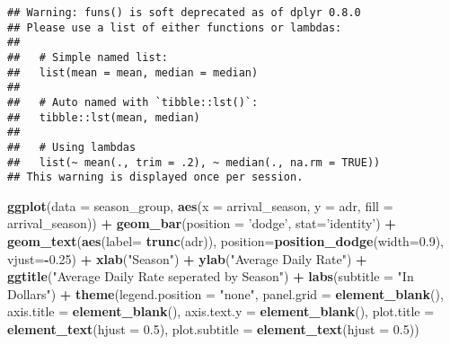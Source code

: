 \documentclass[]{article}
\newenvironment{Shaded}{\begin{snugshade}}{\end{snugshade}}
\newcommand{\DataTypeTok}[1]{\textcolor[rgb]{0.13,0.29,0.53}{#1}}
\newcommand{\FloatTok}[1]{\textcolor[rgb]{0.00,0.00,0.81}{#1}}
\newcommand{\KeywordTok}[1]{\textcolor[rgb]{0.13,0.29,0.53}{\textbf{#1}}}
\newcommand{\NormalTok}[1]{#1}
\newcommand{\OperatorTok}[1]{\textcolor[rgb]{0.81,0.36,0.00}{\textbf{#1}}}
\newcommand{\StringTok}[1]{\textcolor[rgb]{0.31,0.60,0.02}{#1}}
\begin{document}
\begin{verbatim}
## Warning: funs() is soft deprecated as of dplyr 0.8.0
## Please use a list of either functions or lambdas: 
## 
##   # Simple named list: 
##   list(mean = mean, median = median)
## 
##   # Auto named with `tibble::lst()`: 
##   tibble::lst(mean, median)
## 
##   # Using lambdas
##   list(~ mean(., trim = .2), ~ median(., na.rm = TRUE))
## This warning is displayed once per session.
\end{verbatim}

\begin{Shaded}
\begin{Highlighting}[]
\KeywordTok{ggplot}\NormalTok{(}\DataTypeTok{data =}\NormalTok{ season_group, }\KeywordTok{aes}\NormalTok{(}\DataTypeTok{x =}\NormalTok{ arrival_season, }\DataTypeTok{y =}\NormalTok{ adr, }\DataTypeTok{fill =}\NormalTok{ arrival_season)) }\OperatorTok{+}
\StringTok{  }\KeywordTok{geom_bar}\NormalTok{(}\DataTypeTok{position =} \StringTok{'dodge'}\NormalTok{, }\DataTypeTok{stat=}\StringTok{'identity'}\NormalTok{) }\OperatorTok{+}
\StringTok{  }\KeywordTok{geom_text}\NormalTok{(}\KeywordTok{aes}\NormalTok{(}\DataTypeTok{label=} \KeywordTok{trunc}\NormalTok{(adr)), }\DataTypeTok{position=}\KeywordTok{position_dodge}\NormalTok{(}\DataTypeTok{width=}\FloatTok{0.9}\NormalTok{), }\DataTypeTok{vjust=}\OperatorTok{-}\FloatTok{0.25}\NormalTok{) }\OperatorTok{+}
\StringTok{  }\KeywordTok{xlab}\NormalTok{(}\StringTok{"Season"}\NormalTok{) }\OperatorTok{+}\StringTok{ }\KeywordTok{ylab}\NormalTok{(}\StringTok{"Average Daily Rate"}\NormalTok{) }\OperatorTok{+}\StringTok{ }\KeywordTok{ggtitle}\NormalTok{(}\StringTok{"Average Daily Rate seperated by Season"}\NormalTok{) }\OperatorTok{+}\StringTok{ }\KeywordTok{labs}\NormalTok{(}\DataTypeTok{subtitle =} \StringTok{"In Dollars"}\NormalTok{) }\OperatorTok{+}\StringTok{ }
\StringTok{  }\KeywordTok{theme}\NormalTok{(}\DataTypeTok{legend.position =} \StringTok{"none"}\NormalTok{, }\DataTypeTok{panel.grid =} \KeywordTok{element_blank}\NormalTok{(),}
        \DataTypeTok{axis.title =} \KeywordTok{element_blank}\NormalTok{(),}
        \DataTypeTok{axis.text.y =} \KeywordTok{element_blank}\NormalTok{(),}
        \DataTypeTok{plot.title =} \KeywordTok{element_text}\NormalTok{(}\DataTypeTok{hjust =} \FloatTok{0.5}\NormalTok{),}
        \DataTypeTok{plot.subtitle =} \KeywordTok{element_text}\NormalTok{(}\DataTypeTok{hjust =} \FloatTok{0.5}\NormalTok{))}
\end{Highlighting}
\end{Shaded}
\end{document}
